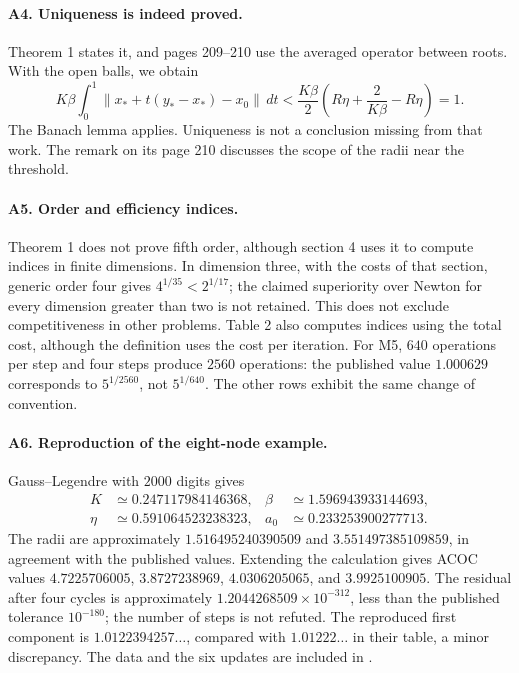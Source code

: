 \documentclass[11pt,a4paper]{article}
\numberwithin{equation}{section}
\numberwithin{table}{section}
\theoremstyle{plain}
\theoremstyle{definition}\newtheorem{definition}[theorem]{Definition}
\theoremstyle{remark}\newtheorem{remark}[theorem]{Remark}
\begin{document}
\paragraph{A4. Uniqueness is indeed proved.}
Theorem 1 states it, and pages 209--210 use the averaged operator
between roots. With the open balls, we obtain
\[
 K\beta\int_0^1\|x_*+t(y_*-x_*)-x_0\|\,dt
 <\frac{K\beta}{2}\left(R\eta+\frac2{K\beta}-R\eta\right)=1.
\]
The Banach lemma applies. Uniqueness is not a conclusion missing from
that work. The remark on its page 210 discusses the scope of the
radii near the threshold.

\paragraph{A5. Order and efficiency indices.}
Theorem 1 does not prove fifth order, although section 4 uses it to
compute indices in finite dimensions. In dimension three, with the
costs of that section, generic order four gives $4^{1/35}<2^{1/17}$;
the claimed superiority over Newton for every dimension greater than
two is not retained. This does not exclude competitiveness in other
problems. Table 2 also computes indices using the total cost, although
the definition uses the cost per iteration. For M5, $640$ operations
per step and four steps produce $2560$ operations: the published value
$1.000629$ corresponds to $5^{1/2560}$, not $5^{1/640}$.
The other rows exhibit the same change of convention.

\paragraph{A6. Reproduction of the eight-node example.}
Gauss--Legendre with $2000$ digits gives
\[
\begin{aligned}
 K&\simeq0.247117984146368,& \beta&\simeq1.596943933144693,\\
 \eta&\simeq0.591064523238323,& a_0&\simeq0.233253900277713.
\end{aligned}
\]
The radii are approximately $1.516495240390509$ and $3.551497385109859$,
in agreement with the published values. Extending the calculation
gives ACOC values $4.7225706005$, $3.8727238969$, $4.0306205065$, and
$3.9925100905$. The residual after four cycles is approximately
$1.2044268509\times10^{-312}$, less than the published tolerance
$10^{-180}$; the number of steps is not refuted. The reproduced first
component is $1.0122394257\ldots$, compared with $1.01222\ldots$ in
their table, a minor discrepancy. The data and the six updates are
included in .
\end{document}
